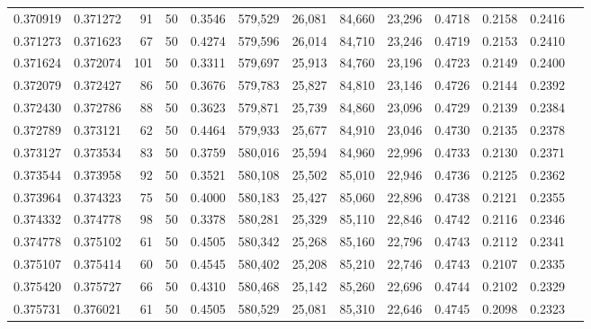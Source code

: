 \begin{tabular}{rrrrrrrrrrrrr}
0.370919 & 0.371272 &    91 &  50 &                                     0.3546 & 579,529 &  26,081 &  84,660 &  23,296 & 0.4718 & 0.2158 & 0.2416 \\
0.371273 & 0.371623 &    67 &  50 &                                     0.4274 & 579,596 &  26,014 &  84,710 &  23,246 & 0.4719 & 0.2153 & 0.2410 \\
0.371624 & 0.372074 &   101 &  50 &                                     0.3311 & 579,697 &  25,913 &  84,760 &  23,196 & 0.4723 & 0.2149 & 0.2400 \\
0.372079 & 0.372427 &    86 &  50 &                                     0.3676 & 579,783 &  25,827 &  84,810 &  23,146 & 0.4726 & 0.2144 & 0.2392 \\
0.372430 & 0.372786 &    88 &  50 &                                     0.3623 & 579,871 &  25,739 &  84,860 &  23,096 & 0.4729 & 0.2139 & 0.2384 \\
0.372789 & 0.373121 &    62 &  50 &                                     0.4464 & 579,933 &  25,677 &  84,910 &  23,046 & 0.4730 & 0.2135 & 0.2378 \\
0.373127 & 0.373534 &    83 &  50 &                                     0.3759 & 580,016 &  25,594 &  84,960 &  22,996 & 0.4733 & 0.2130 & 0.2371 \\
0.373544 & 0.373958 &    92 &  50 &                                     0.3521 & 580,108 &  25,502 &  85,010 &  22,946 & 0.4736 & 0.2125 & 0.2362 \\
0.373964 & 0.374323 &    75 &  50 &                                     0.4000 & 580,183 &  25,427 &  85,060 &  22,896 & 0.4738 & 0.2121 & 0.2355 \\
0.374332 & 0.374778 &    98 &  50 &                                     0.3378 & 580,281 &  25,329 &  85,110 &  22,846 & 0.4742 & 0.2116 & 0.2346 \\
0.374778 & 0.375102 &    61 &  50 &                                     0.4505 & 580,342 &  25,268 &  85,160 &  22,796 & 0.4743 & 0.2112 & 0.2341 \\
0.375107 & 0.375414 &    60 &  50 &                                     0.4545 & 580,402 &  25,208 &  85,210 &  22,746 & 0.4743 & 0.2107 & 0.2335 \\
0.375420 & 0.375727 &    66 &  50 &                                     0.4310 & 580,468 &  25,142 &  85,260 &  22,696 & 0.4744 & 0.2102 & 0.2329 \\
0.375731 & 0.376021 &    61 &  50 &                                     0.4505 & 580,529 &  25,081 &  85,310 &  22,646 & 0.4745 & 0.2098 & 0.2323 \\

\end{tabular}
